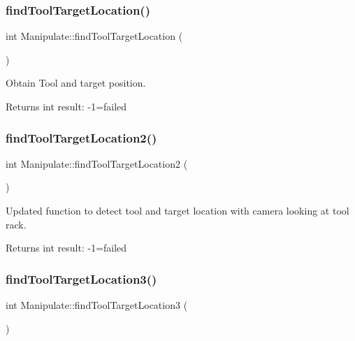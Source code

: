 \subsubsection{\texorpdfstring{find\+Tool\+Target\+Location()}{findToolTargetLocation()}}
{\footnotesize\ttfamily int Manipulate\+::find\+Tool\+Target\+Location (\begin{DoxyParamCaption}{ }\end{DoxyParamCaption})\hspace{0.3cm}{\ttfamily [private]}}



Obtain Tool and target position. 

\begin{DoxyReturn}{Returns}
int result\+: -\/1=failed 
\end{DoxyReturn}
\mbox{\label{structManipulate_a9f8d8093a4a0d0adf0a00148673f5781}} 
\subsubsection{\texorpdfstring{find\+Tool\+Target\+Location2()}{findToolTargetLocation2()}}
{\footnotesize\ttfamily int Manipulate\+::find\+Tool\+Target\+Location2 (\begin{DoxyParamCaption}{ }\end{DoxyParamCaption})\hspace{0.3cm}{\ttfamily [private]}}



Updated function to detect tool and target location with camera looking at tool rack. 

\begin{DoxyReturn}{Returns}
int result\+: -\/1=failed 
\end{DoxyReturn}
\mbox{\label{structManipulate_aeb62b4d4b898f5a403e75ada463bbeb4}} 
\subsubsection{\texorpdfstring{find\+Tool\+Target\+Location3()}{findToolTargetLocation3()}}
{\footnotesize\ttfamily int Manipulate\+::find\+Tool\+Target\+Location3 (\begin{DoxyParamCaption}{ }\end{DoxyParamCaption})\hspace{0.3cm}{\ttfamily [private]}}



